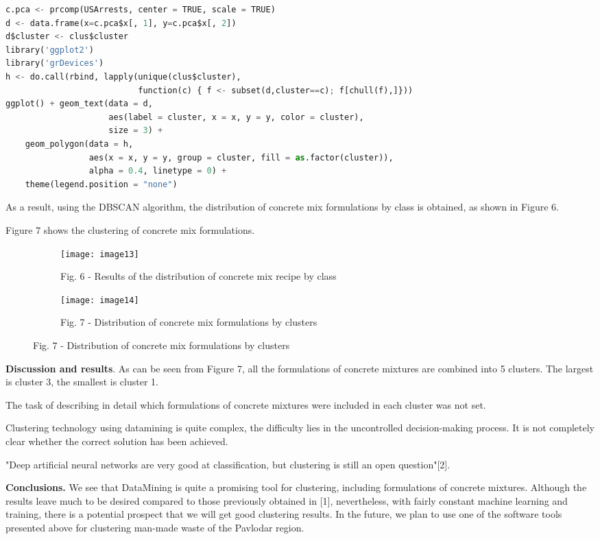 \begin{lstlisting}[language=Python]
c.pca <- prcomp(USArrests, center = TRUE, scale = TRUE) 
d <- data.frame(x=c.pca$x[, 1], y=c.pca$x[, 2])
d$cluster <- clus$cluster
library('ggplot2')
library('grDevices')
h <- do.call(rbind, lapply(unique(clus$cluster),
                           function(c) { f <- subset(d,cluster==c); f[chull(f),]}))
ggplot() + geom_text(data = d, 
                     aes(label = cluster, x = x, y = y, color = cluster), 
                     size = 3) +
    geom_polygon(data = h, 
                 aes(x = x, y = y, group = cluster, fill = as.factor(cluster)),
                 alpha = 0.4, linetype = 0) +
    theme(legend.position = "none")
\end{lstlisting}

As a result, using the DBSCAN algorithm, the distribution of concrete
mix formulations by class is obtained, as shown in Figure 6.

Figure 7 shows the clustering of concrete mix formulations.

\begin{figure}[H]
\begin{subfigure}[b]{0.45\textwidth}
  \centering
  \texttt{[image: image13]}
  \caption*{Fig. 6 - Results of the distribution of concrete mix recipe by class}
\end{subfigure}
\begin{subfigure}[b]{0.45\textwidth}
  \centering
  \texttt{[image: image14]}
  \caption*{Fig. 7 - Distribution of concrete mix formulations by clusters}
\end{subfigure}
\end{figure}

\begin{multicols}{2}
{\bfseries Discussion and results}. As can be seen from Figure 7, all the
formulations of concrete mixtures are combined into 5 clusters. The
largest is cluster 3, the smallest is cluster 1.

The task of describing in detail which formulations of concrete mixtures
were included in each cluster was not set.

Clustering technology using datamining is quite complex, the difficulty
lies in the uncontrolled decision-making process. It is not completely
clear whether the correct solution has been achieved.

"Deep artificial neural networks are very good at classification, but
clustering is still an open question"{[}2{]}.

{\bfseries Conclusions.} We see that DataMining is quite a promising tool
for clustering, including formulations of concrete mixtures. Although
the results leave much to be desired compared to those previously
obtained in {[}1{]}, nevertheless, with fairly constant machine learning
and training, there is a potential prospect that we will get good
clustering results. In the future, we plan to use one of the software
tools presented above for clustering man-made waste of the Pavlodar
region.
\end{multicols}

